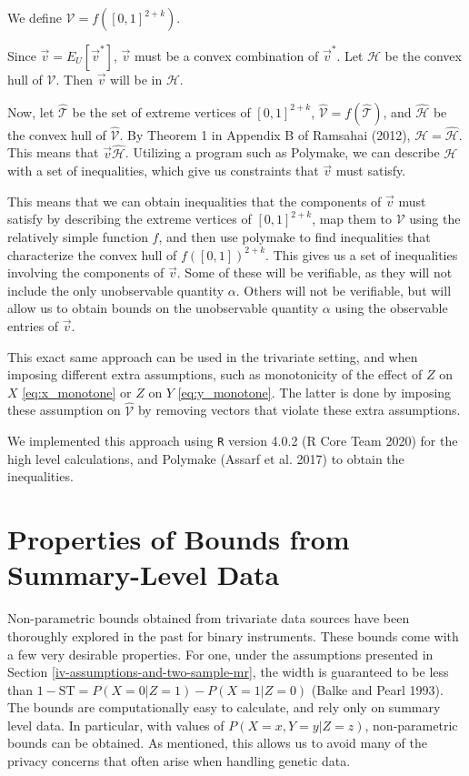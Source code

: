 \documentclass[
]{article}
\theoremstyle{plain}
\begin{document}
We define \(\mathcal{V} = f([0,1]^{2+k})\).

Since \(\vec{v} = E_U[\vec{v}^*]\), \(\vec{v}\) must be a convex combination of \(\vec{v}^*\). Let \(\mathcal{H}\) be the convex hull of \(\mathcal{V}\). Then \(\vec{v}\) will be in \(\mathcal{H}\).

Now, let \(\hat{\mathcal{T}}\) be the set of extreme vertices of \([0,1]^{2+k}\), \(\hat{\mathcal{V}} = f(\hat{\mathcal{T}})\), and \(\hat{\mathcal{H}}\) be the convex hull of \(\hat{\mathcal{V}}\). By Theorem 1 in Appendix B of Ramsahai (2012), \(\mathcal{H} = \mathcal{\hat{H}}\). This means that \(\vec{v} \mathcal{\hat{H}}\). Utilizing a program such as Polymake, we can describe \(\mathcal{H}\) with a set of inequalities, which give us constraints that \(\vec{v}\) must satisfy.

This means that we can obtain inequalities that the components of \(\vec{v}\) must satisfy by describing the extreme vertices of \([0,1]^{2+k}\), map them to \(\mathcal{V}\) using the relatively simple function \(f\), and then use polymake to find inequalities that characterize the convex hull of \(f([0,1])^{2+k}\). This gives us a set of inequalities involving the components of \(\vec{v}\). Some of these will be verifiable, as they will not include the only unobservable quantity \(\alpha\). Others will not be verifiable, but will allow us to obtain bounds on the unobservable quantity \(\alpha\) using the observable entries of \(\vec{v}\).

This exact same approach can be used in the trivariate setting, and when imposing different extra assumptions, such as monotonicity of the effect of \(Z\) on \(X\) \eqref{eq:x_monotone} or \(Z\) on \(Y\) \eqref{eq:y_monotone}. The latter is done by imposing these assumption on \(\hat{\mathcal{V}}\) by removing vectors that violate these extra assumptions.

We implemented this approach using \texttt{R} version 4.0.2 (R Core Team 2020) for the high level calculations, and Polymake (Assarf et al. 2017) to obtain the inequalities.

\hypertarget{properties-of-bounds-from-summary-level-data}{%
\section{Properties of Bounds from Summary-Level Data}\label{properties-of-bounds-from-summary-level-data}}

Non-parametric bounds obtained from trivariate data sources have been thoroughly explored in the past for binary instruments. These bounds come with a few very desirable properties. For one, under the assumptions presented in Section \ref{iv-assumptions-and-two-sample-mr}, the width is guaranteed to be less than \(1 - \text{ST} = P(X = 0 | Z = 1) - P(X = 1 | Z = 0)\) (Balke and Pearl 1993). The bounds are computationally easy to calculate, and rely only on summary level data. In particular, with values of \(P(X = x, Y = y | Z = z)\), non-parametric bounds can be obtained. As mentioned, this allows us to avoid many of the privacy concerns that often arise when handling genetic data.
\end{document}
